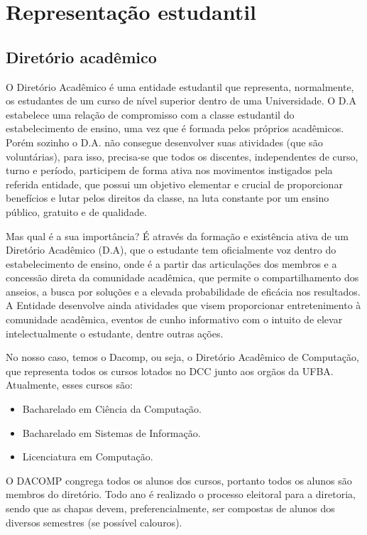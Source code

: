 \chapter{Representação estudantil}

\section{Diretório acadêmico}

O Diretório Acadêmico é uma entidade estudantil que representa, normalmente, os estudantes de um curso de nível superior dentro de uma Universidade. O D.A estabelece uma relação de compromisso com a classe estudantil do estabelecimento de ensino, uma vez que é formada pelos próprios acadêmicos. Porém sozinho o D.A. não consegue desenvolver suas atividades (que são voluntárias), para isso, precisa-se que todos os discentes, independentes de curso, turno e período, participem de forma ativa nos movimentos instigados pela referida entidade, que possui um objetivo elementar e crucial de proporcionar benefícios e lutar pelos direitos da classe, na luta constante por um ensino público, gratuito e de qualidade.

	Mas qual é a sua importância? É através da formação e existência ativa de um Diretório Acadêmico (D.A), que o estudante tem oficialmente voz dentro do estabelecimento de ensino, onde é a partir das articulações dos membros e a concessão direta da comunidade acadêmica, que permite o compartilhamento dos anseios, a busca por soluções e a elevada probabilidade de eficácia nos resultados. A Entidade desenvolve ainda atividades que visem proporcionar entretenimento à comunidade acadêmica, eventos de cunho informativo com o intuito de elevar intelectualmente o estudante, dentre outras ações.

	No nosso caso, temos o Dacomp, ou seja, o Diretório Acadêmico de Computação, que representa todos os cursos lotados no DCC junto aos orgãos da UFBA. Atualmente, esses cursos são:
  \begin{itemize}
 \item Bacharelado em Ciência da Computação.
 \item Bacharelado em Sistemas de Informação.
 \item Licenciatura em Computação.
 \end{itemize}

	O DACOMP congrega todos os alunos dos cursos, portanto todos os alunos são membros do diretório.
Todo ano é realizado o processo eleitoral para a diretoria, sendo que as chapas devem, preferencialmente, ser compostas de alunos dos diversos semestres (se possível calouros). 
\\

